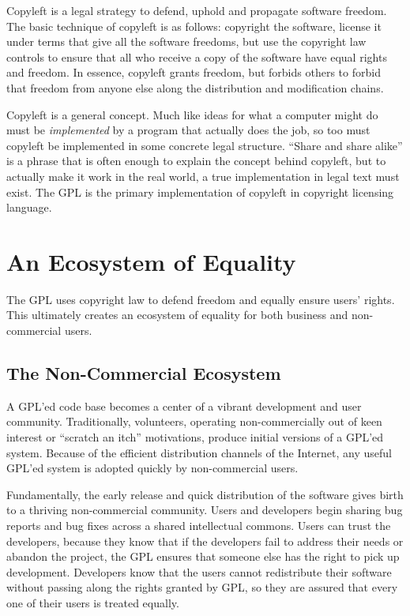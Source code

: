 \documentclass[12pt]{report}
\begin{document}
Copyleft is a legal strategy to defend, uphold and propagate software
freedom.  The basic technique of copyleft is as follows: copyright the
software, license it under terms that give all the software freedoms, but
use the copyright law controls to ensure that all who receive a copy of
the software have equal rights and freedom.  In essence, copyleft grants
freedom, but forbids others to forbid that freedom from anyone else along
the distribution and modification chains.

Copyleft is a general concept.  Much like ideas for what a computer might
do must be \emph{implemented} by a program that actually does the job, so
too must copyleft be implemented in some concrete legal structure.
``Share and share alike'' is a phrase that is often enough to explain the
concept behind copyleft, but to actually make it work in the real world, a
true implementation in legal text must exist.  The GPL is the primary
implementation of copyleft in copyright licensing language.

\section{An Ecosystem of Equality}

The GPL uses copyright law to defend freedom and equally ensure users'
rights.  This ultimately creates an ecosystem of equality for both
business and non-commercial users.

\subsection{The Non-Commercial Ecosystem}

A GPL'ed code base becomes a center of a vibrant development and user
community.  Traditionally, volunteers, operating non-commercially out of
keen interest or ``scratch an itch'' motivations, produce initial versions
of a GPL'ed system.  Because of the efficient distribution channels of the
Internet, any useful GPL'ed system is adopted quickly by non-commercial
users.

Fundamentally, the early release and quick distribution of the software
gives birth to a thriving non-commercial community.  Users and developers
begin sharing bug reports and bug fixes across a shared intellectual
commons.  Users can trust the developers, because they know that if the
developers fail to address their needs or abandon the project, the GPL
ensures that someone else has the right to pick up development.
Developers know that the users cannot redistribute their software without
passing along the rights granted by GPL, so they are assured that every
one of their users is treated equally.
\end{document}
